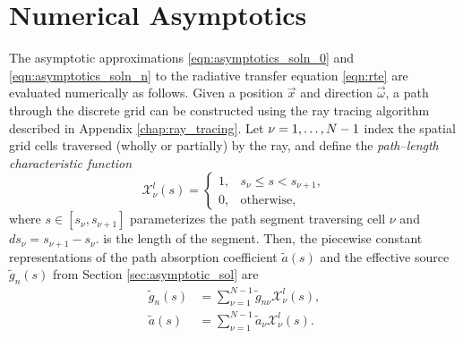 \section{Numerical Asymptotics}
\label{sec:num_asymptotics}
The asymptotic approximations \eqref{eqn:asymptotics_soln_0} and \eqref{eqn:asymptotics_soln_n} to the radiative transfer equation \eqref{eqn:rte} are evaluated numerically as follows.
Given a position $\vec{x}$ and direction $\vec{\omega}$, a path through the discrete grid can be constructed using the ray tracing algorithm described in Appendix \ref{chap:ray_tracing}.
Let $\nu=1,\ldots,N\nobreak-\nobreak1$ index the spatial grid cells traversed (wholly or partially) by the ray, and define the \textit{path--length characteristic function}
\begin{equation*}
  \mathcal{X}^l_\nu(s) = \begin{cases}
    1, & s_\nu \leq s < s_{\nu+1}, \\
    0, & \mbox{otherwise},
    \end{cases}
\end{equation*}
where $s \in [s_\nu, s_{\nu+1}]$ parameterizes the path segment traversing cell $\nu$ and $ds_\nu = s_{\nu+1} - s_\nu.$ is the length of the segment.
Then, the piecewise constant representations of the path absorption coefficient $\tilde{a}(s)$ and the effective source $\tilde{g}_n(s)$ from Section \ref{sec:asymptotic_sol} are
\begin{align*}
  \tilde{g}_n(s) &= \sum_{\nu=1}^{N-1}\tilde{g}_{n\nu}\mathcal{X}^l_\nu(s), \\
  \tilde{a}(s) &= \sum_{\nu=1}^{N-1}\tilde{a}_{\nu}\mathcal{X}^l_\nu(s).
\end{align*}

